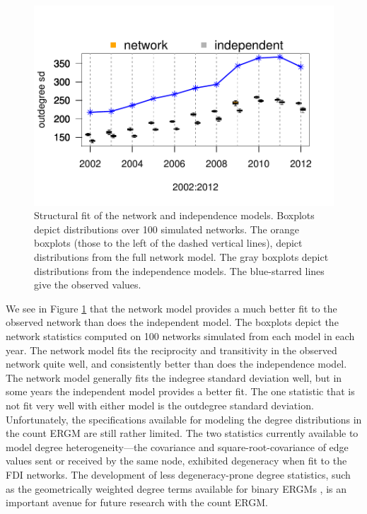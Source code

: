 \documentclass[reqno,onecolumn,letterpaper,12pt]{article}
\begin{document}
\begin{figure}[]
	\includegraphics[scale=.75, trim = 0cm 1.5cm .1cm 2.4cm, clip=true]{figures/odsd_fit.pdf} \vspace{-.2cm}
	\caption{\label{fig:structureFit} Structural fit of the network and independence models. Boxplots depict distributions over 100 simulated networks. The orange boxplots (those to the left of the dashed vertical lines), depict distributions from the full network model. The gray boxplots depict distributions from the independence models. The blue-starred lines give the observed values. }
\end{figure}
We see in Figure \ref{fig:structureFit} that the network model provides a much better fit to the observed network than does the independent model. The boxplots depict the network statistics computed on 100 networks simulated from each model in each year. The network model fits the reciprocity and transitivity in the observed network quite well, and consistently better than does the independence model. The network model generally fits the indegree standard deviation well, but in some years the independent model provides a better fit. The one statistic that is not fit very well with either model is the outdegree standard deviation. Unfortunately, the specifications available for modeling the degree distributions in the count ERGM are still rather limited. The two statistics currently available to model degree heterogeneity---the covariance and square-root-covariance of edge values sent or received by the same node, exhibited degeneracy when fit to the FDI networks. The development of less degeneracy-prone degree statistics, such as the geometrically weighted degree terms available for binary ERGMs \citep{snijders2006new}, is an important avenue for future research with the count ERGM.
\end{document}

